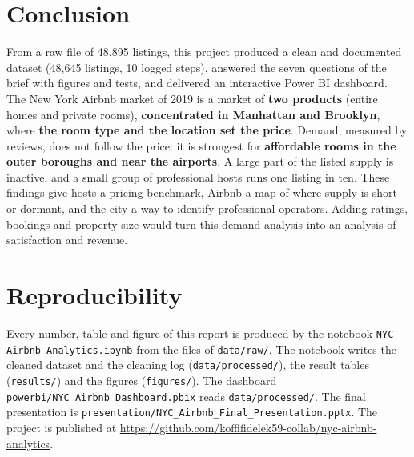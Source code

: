 \documentclass[12pt,a4paper]{article}
\begin{document}
\section{Conclusion}

From a raw file of 48{,}895 listings, this project produced a clean and documented dataset (48{,}645
listings, 10 logged steps), answered the seven questions of the brief with figures and tests, and
delivered an interactive Power BI dashboard. The New York Airbnb market of 2019 is a market of
\textbf{two products} (entire homes and private rooms), \textbf{concentrated in Manhattan and
Brooklyn}, where \textbf{the room type and the location set the price}. Demand, measured by reviews,
does not follow the price: it is strongest for \textbf{affordable rooms in the outer boroughs and near
the airports}. A large part of the listed supply is inactive, and a small group of professional hosts
runs one listing in ten. These findings give hosts a pricing benchmark, Airbnb a map of where supply
is short or dormant, and the city a way to identify professional operators. Adding ratings, bookings
and property size would turn this demand analysis into an analysis of satisfaction and revenue.

\section*{Reproducibility}

Every number, table and figure of this report is produced by the notebook
\nolinkurl{NYC-Airbnb-Analytics.ipynb} from the files of \nolinkurl{data/raw/}. The notebook writes
the cleaned dataset and the cleaning log (\nolinkurl{data/processed/}), the result tables
(\nolinkurl{results/}) and the figures (\nolinkurl{figures/}). The dashboard
\nolinkurl{powerbi/NYC_Airbnb_Dashboard.pbix} reads \nolinkurl{data/processed/}. The final presentation is
\nolinkurl{presentation/NYC_Airbnb_Final_Presentation.pptx}. The project is
published at \url{https://github.com/koffifidelek59-collab/nyc-airbnb-analytics}.
\end{document}
